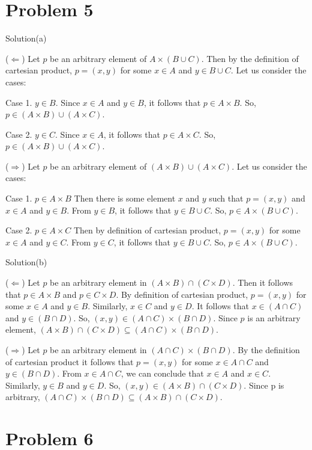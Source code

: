\documentclass{article}
\begin{document}
\section{Problem 5}

Solution(a)

($ \Leftarrow $) Let $p$ be an arbitrary element of $A \times (B \cup C)$. Then by the
definition of cartesian product, $p = (x,y)$ for some $x \in A$ and $y
\in B \cup C$. Let us consider the cases:

Case 1. $y \in B$. Since $x \in A$ and $y \in B$, it follows that $p
\in A \times B$. So, $p \in (A \times B) \cup (A \times C)$.

Case 2. $y \in C$. Since $x \in A$, it follows that $p \in A \times
C$. So, $p \in (A \times B) \cup (A \times C)$.

($ \Rightarrow $) Let $p$ be an arbitrary element of $(A \times B)
\cup (A \times C)$. Let us consider the cases:

Case 1. $p \in A \times B$ Then there is some element $x$ and $y$ such
that $p = (x,y)$ and $x \in A$ and $y \in B$. From $y \in B$, it
follows that $y \in B \cup C$. So, $p \in A \times (B \cup C)$.

Case 2. $p \in A \times C$ Then by definition of cartesian product, $p
= (x,y)$ for some $x \in A$ and $y \in C$. From $y \in C$, it follows
that $y \in B \cup C$. So, $p \in A \times (B \cup C)$.

Solution(b)

($ \Leftarrow $) Let $p$ be an arbitrary element in $(A \times B) \cap
(C \times D)$. Then it follows that $p \in A \times B$ and $p \in C
\times D$. By definition of cartesian product, $p = (x,y)$ for some $x
\in A$ and $y \in B$. Similarly, $x \in C$ and $y \in D$. It follows
that $x \in (A \cap C)$ and $y \in (B \cap D)$. So, $(x,y) \in (A \cap
C) \times (B \cap D)$. Since $p$ is an arbitrary element, $(A \times
B) \cap (C \times D) \subseteq (A \cap C) \times (B \cap D)$.

($ \Rightarrow $) Let $p$ be an arbitrary element in $(A \cap C)
\times (B \cap D)$. By the definition of cartesian product it follows
that $p = (x,y)$ for some $x \in A \cap C$ and $y \in (B \cap D)$.
From $x \in A \cap C$, we can conclude that $x \in A$ and $x \in C$.
Similarly, $y \in B$ and $y \in D$. So, $(x,y) \in (A \times B) \cap
(C \times D)$. Since p is arbitrary, $(A \cap C) \times (B \cap D)
\subseteq (A \times B) \cap (C \times D)$.

\section{Problem 6}
\end{document}
